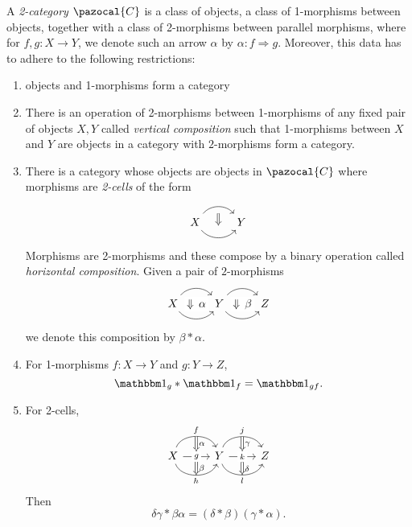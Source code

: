 \begin{definition}
    A \emph{2-category} $\pazocal{C}$ is a class of objects, a class of 1-morphisms between objects, together with a class of 2-morphisms between parallel morphisms, where for $f,g : X\rightarrow Y$, we denote such an arrow $\alpha$ by $\alpha : f\Rightarrow g$. Moreover, this data has to adhere to the following restrictions: 
    \begin{enumerate}
        \item objects and 1-morphisms form a category
        \item There is an operation of 2-morphisms between 1-morphisms of any fixed pair of objects $X,Y$ called \emph{vertical composition} such that 1-morphisms between $X$ and $Y$ are objects in a category with $2$-morphisms form a category. 
        \item There is a category whose objects are objects in $\pazocal{C}$ where morphisms are \emph{2-cells} of the form 
        $$
            \begin{tikzcd}
                X \arrow[r, bend right=50,""{name=a}] \arrow[r,bend left=50,""{name=b}] & Y \arrow[Rightarrow,from=b, to=a,shorten <= 6, shorten >= 6]
            \end{tikzcd}
        $$
        Morphisms are 2-morphisms and these compose by a binary operation called \emph{horizontal composition}. Given a pair of $2$-morphisms
        $$
            \begin{tikzcd}
                X
                \arrow[r, bend left=50]
                \arrow[r, bend right=50]
                \arrow[phantom, from=1-1, to=1-2, "\Downarrow\,\alpha" description,
                shorten >=4pt, shorten <=4pt]
                & Y
                \arrow[r, bend left=50]
                \arrow[r, bend right=50]
                \arrow[phantom, from=1-2, to=1-3, "\Downarrow\,\beta" description,
                shorten >=4pt, shorten <=4pt]
                & Z
            \end{tikzcd}
        $$
        we denote this composition by $\beta\ast\alpha$.
        \item For 1-morphisms $f : X\rightarrow Y$ and $g: Y\rightarrow Z$, 
        $$
            \fone_g\ast\fone_f = \fone_{gf}.
        $$
        \item 
        For 2-cells,
        $$
        \begin{tikzcd}
            X \arrow[r, bend left=70, "f"{name=F}] \arrow[r, "g"{name=G, description}]
            \arrow[r, bend right=70, "h"{name=H,swap}] & Y \arrow[Rightarrow, from=F, to=G, "\alpha"]\arrow[Rightarrow,from=G, to=H, "\beta"] \arrow[r, bend left=70, "j"{name=J}] \arrow[r, "k"{name=K, description}]
            \arrow[r, bend right=70, "l"{name=L,swap}] & Z \arrow[Rightarrow, from=J, to=K,"\gamma"]\arrow[Rightarrow, from=K, to=L, "\delta"]
        \end{tikzcd}
    $$
    Then 
    $$
        \delta\gamma \ast \beta\alpha = (\delta\ast \beta)(\gamma\ast \alpha).
    $$
   \end{enumerate} 
\end{definition}
